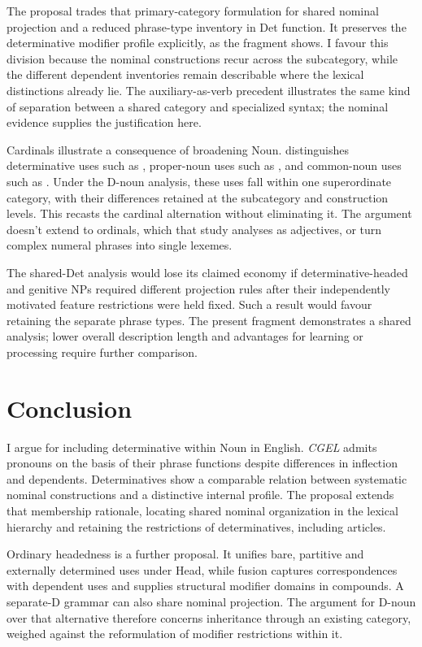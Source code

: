 \documentclass[12pt]{article}
\begin{document}
The proposal trades that primary-category formulation for shared nominal projection and a reduced phrase-type inventory in Det function. It preserves the determinative modifier profile explicitly, as the fragment shows. I favour this division because the nominal constructions recur across the subcategory, while the different dependent inventories remain describable where the lexical distinctions already lie. The auxiliary-as-verb precedent illustrates the same kind of separation between a shared category and specialized syntax; the nominal evidence supplies the justification here.

Cardinals illustrate a consequence of broadening Noun. \textcite{reynolds2026numerals} distinguishes determinative uses such as , proper-noun uses such as , and common-noun uses such as . Under the D-noun analysis, these uses fall within one superordinate category, with their differences retained at the subcategory and construction levels. This recasts the cardinal alternation without eliminating it. The argument doesn't extend to ordinals, which that study analyses as adjectives, or turn complex numeral phrases into single lexemes.

The shared-Det analysis would lose its claimed economy if determinative-headed and genitive NPs required different projection rules after their independently motivated feature restrictions were held fixed. Such a result would favour retaining the separate phrase types. The present fragment demonstrates a shared analysis; lower overall description length and advantages for learning or processing require further comparison.

\section{Conclusion}\label{sec:conclusion}

I argue for including determinative within Noun in English. \textit{CGEL} admits pronouns on the basis of their phrase functions despite differences in inflection and dependents. Determinatives show a comparable relation between systematic nominal constructions and a distinctive internal profile. The proposal extends that membership rationale, locating shared nominal organization in the lexical hierarchy and retaining the restrictions of determinatives, including articles.

Ordinary headedness is a further proposal. It unifies bare, partitive and externally determined uses under Head, while fusion captures correspondences with dependent uses and supplies structural modifier domains in compounds. A separate-D grammar can also share nominal projection. The argument for D-noun over that alternative therefore concerns inheritance through an existing category, weighed against the reformulation of modifier restrictions within it.
\end{document}
